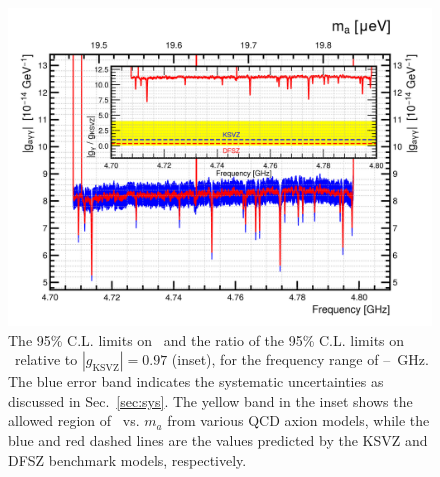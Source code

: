 \begin{figure} [htbp]
  \centering
  \includegraphics[width=12.9cm]{figures/TASEHonly_limits.png}
  \caption{The 95\% C.L. limits on \gagg\ and the ratio of the 
95\% C.L. limits on \ggamma\ relative to $\left|g_\text{KSVZ}\right|=0.97$ 
  (inset), for the frequency range of 
\flo--\fhi~GHz. The blue error band indicates the systematic 
  uncertainties as discussed in Sec.~\ref{sec:sys}. The yellow 
 band in the inset shows the allowed region of \ggamma\ vs. $m_a$ 
 from various QCD axion models, while the blue and red dashed lines are the 
values predicted by the KSVZ and DFSZ benchmark models, respectively.}
  \label{fig:glimit}
\end{figure}


